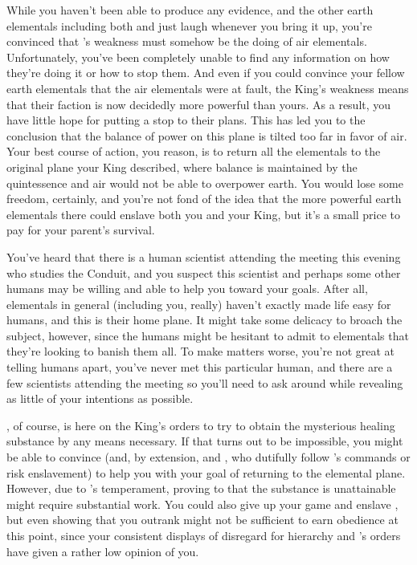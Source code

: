 \documentclass[char]{elementals}
\begin{document}
While you haven't been able to produce any evidence, and the other earth elementals including both \cEarthKing{} and \cLoyal{} just laugh whenever you bring it up, you're convinced that \cEarthKing{}'s weakness must somehow be the doing of air elementals.  Unfortunately, you've been completely unable to find any information on how they're doing it or how to stop them.  And even if you could convince your fellow earth elementals that the air elementals were at fault, the King's weakness means that their faction is now decidedly more powerful than yours.  As a result, you have little hope for putting a stop to their plans.  This has led you to the conclusion that the balance of power on this plane is tilted too far in favor of air.  Your best course of action, you reason, is to return all the elementals to the original plane your King described, where balance is maintained by the quintessence and air would not be able to overpower earth.  You would lose some freedom, certainly, and you're not fond of the idea that the more powerful earth elementals there could enslave both you and your King, but it's a small price to pay for your parent's survival.

You've heard that there is a human scientist attending the meeting this evening who studies the Conduit, and you suspect this scientist and perhaps some other humans may be willing and able to help you toward your goals.  After all, elementals in general (including you, really) haven't exactly made life easy for humans, and this is their home plane.  It might take some delicacy to broach the subject, however, since  the humans might be hesitant to admit to elementals that they're looking to banish them all.  To make matters worse, you're not great at telling humans apart, you've never met this particular human, and there are a few scientists attending the meeting so you'll need to ask around while revealing as little of your intentions as possible.

\cLoyal{}, of course, is here on the King's orders to try to obtain the mysterious healing substance by any means necessary.  If that turns out to be impossible, you might be able to convince \cLoyal{\them} (and, by extension, \cMinion{} and \cMiniEarth{}, who  dutifully follow \cLoyal{}'s commands or risk enslavement) to help you with your goal of returning to the elemental plane.  However, due to \cLoyal{}'s temperament, proving to \cLoyal{\them} that the substance is unattainable might require substantial work.  You could also give up your game and enslave \cLoyal{\them}, but even showing that you outrank \cLoyal{} might not be sufficient to earn \cLoyal{\their} obedience at this point, since your consistent displays of disregard for hierarchy and \cEarthKing{}'s orders have given \cLoyal{} a rather low opinion of you.
\end{document}
